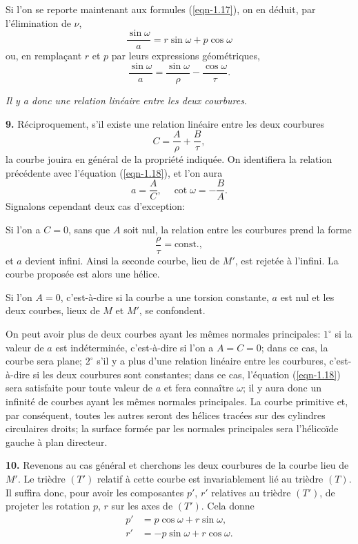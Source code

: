 Si l'on se reporte maintenant aux formules (\ref{eqn-1.17}), on en déduit, par l'élimination de $\nu$,
\[
	\frac{\sin{\omega}}{a} = r \sin\omega + p \cos\omega
\]
ou, en remplaçant $r$ et $p$ par leurs expressions géométriques,
\begin{equation}
	\frac{\sin{\omega}}{a} = \frac{\sin{\omega}}{\rho} - \frac{\cos{\omega}}{\tau}.
	\label{eqn-1.18}
\end{equation}

\textit{Il y a donc une relation linéaire entre les deux courbures}.

\textbf{9.} Réciproquement, s'il existe une relation linéaire entre les deux courbures
\[
	C = \frac{A}{\rho} + \frac{B}{\tau},
\]
la courbe jouira en général de la propriété indiquée. On identifiera la relation précédente avec l'équation 
(\ref{eqn-1.18}), et l'on aura
\[
	a = \frac{A}{C}, \quad \cot{\omega} = -\frac{B}{A}.
\]
Signalons cependant deux cas d'exception:

Si l'on a $C=0$, sans que $A$ soit nul, la relation entre les courbures prend la forme
\[
	\frac{\rho}{\tau} = \textrm{const.},
\]
et $a$ devient infini. Ainsi la seconde courbe, lieu de $M'$, est rejetée à l'infini. La courbe proposée est alors une 
hélice.

Si l'on $A=0$, c'est-à-dire si la courbe a une torsion constante, $a$ est nul et les deux courbes, lieux de $M$ et 
$M'$, se confondent.

On peut avoir plus de deux courbes ayant les mêmes normales principales: $1^\circ$ si la valeur de $a$ est 
indéterminée, c'est-à-dire si l'on a $A=C=0$; dans ce cas, la courbe sera plane; $2^\circ$ s'il y a plus d'une relation 
linéaire entre les courbures, c'est-à-dire si les deux courbures sont constantes; dans ce cas, l'équation 
(\ref{eqn-1.18}) sera satisfaite pour toute valeur de $a$ et fera connaître $\omega$; il y aura donc un infinité de 
courbes ayant les mêmes normales principales. La courbe primitive et, par conséquent, toutes les autres seront des 
hélices tracées sur des cylindres circulaires droits; la surface formée par les normales principales sera l'hélicoïde 
gauche à plan directeur.

\textbf{10.} Revenons au cas général et cherchons les deux courbures de la courbe lieu de $M'$. Le trièdre $(T')$ 
relatif à cette courbe est invariablement lié au trièdre $(T)$. Il suffira donc, pour avoir les composantes $p'$, $r'$ 
relatives au trièdre $(T')$, de projeter les rotation $p$, $r$ sur les axes de $(T')$. Cela donne
\begin{align*}
	p' &=  p\cos\omega + r\sin\omega, \\
	r' &= -p\sin\omega + r\cos\omega. %
\end{align*}

